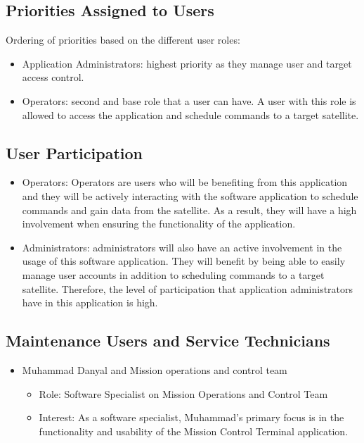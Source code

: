 \documentclass[12pt]{article}
\begin{document}
\subsection{Priorities Assigned to Users}
Ordering of priorities based on the different user roles:
\begin{itemize}
    \item Application Administrators: highest priority as they manage user and target access control.
    \item Operators: second and base role that a user can have. A user with this role is allowed to access the application and schedule commands to a target satellite.

\end{itemize}

\subsection{User Participation}
\begin{itemize}
    \item Operators: Operators are users who will be benefiting from this application and they will be actively interacting with the software application to schedule commands and gain data from the satellite. As a result, they will have a high involvement when ensuring the functionality of the application.
    \item Administrators: administrators will also have an active involvement in the usage of this software application. They will benefit by being able to easily manage user accounts in addition to scheduling commands to a target satellite. Therefore, the level of participation that application administrators have in this application is high.

\end{itemize}

\subsection{Maintenance Users and Service Technicians}
\begin{itemize}
    \item Muhammad Danyal and Mission operations and control team
    \begin{itemize}
        \item Role: Software Specialist on Mission Operations and Control Team
        \item Interest: As a software specialist, Muhammad’s primary focus is in the functionality and usability of the Mission Control Terminal application.

    \end{itemize}
\end{itemize}
\end{document}
